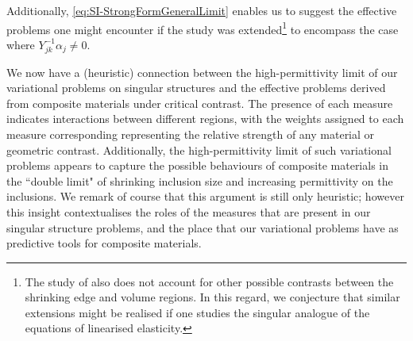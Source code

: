 Additionally, \eqref{eq:SI-StrongFormGeneralLimit} enables us to suggest the effective problems one might encounter if the study \cite{figotin1998spectral} was extended\footnote{The study of \cite{cherednichenko2019homogenisation} also does not account for other possible contrasts between the shrinking edge and volume regions. In this regard, we conjecture that similar extensions might be realised if one studies the singular analogue of the equations of linearised  elasticity.} to encompass the case where $Y_{jk}^{-1}\alpha_j\neq0$.

We now have a (heuristic) connection between the high-permittivity limit of our variational problems on singular structures and the effective problems derived from composite materials under critical contrast.
The presence of each measure indicates interactions between different regions, with the weights assigned to each measure corresponding representing the relative strength of any material or geometric contrast.
Additionally, the high-permittivity limit of such variational problems appears to capture the possible behaviours of composite materials in the ``double limit" of shrinking inclusion size and increasing permittivity on the inclusions.
We remark of course that this argument is still only heuristic; however this insight contextualises the roles of the measures that are present in our singular structure problems, and the place that our variational problems have as predictive tools for composite materials.